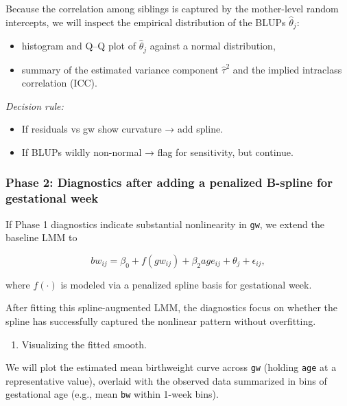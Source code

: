 \documentclass[
  letterpaper,
  DIV=11,
  numbers=noendperiod]{scrreprt}
\providecommand{\tightlist}{%
  \setlength{\itemsep}{0pt}\setlength{\parskip}{0pt}}\usepackage{longtable,booktabs,array}
\begin{document}
Because the correlation among siblings is captured by the mother-level
random intercepts, we will inspect the empirical distribution of the
BLUPs \(\hat\theta_j\):

\begin{itemize}
\tightlist
\item
  histogram and Q--Q plot of \(\hat\theta_j\) against a normal
  distribution,\\
\item
  summary of the estimated variance component \(\hat\tau^2\) and the
  implied intraclass correlation (ICC).
\end{itemize}

\emph{Decision rule:}

\begin{itemize}
\item
  If residuals vs gw show curvature → add spline.
\item
  If BLUPs wildly non-normal → flag for sensitivity, but continue.
\end{itemize}

\hypertarget{phase-2-diagnostics-after-adding-a-penalized-b-spline-for-gestational-week}{%
\subsubsection*{Phase 2: Diagnostics after adding a penalized B-spline
for gestational
week}\label{phase-2-diagnostics-after-adding-a-penalized-b-spline-for-gestational-week}}

If Phase 1 diagnostics indicate substantial nonlinearity in \texttt{gw},
we extend the baseline LMM to

\[
bw_{ij} = \beta_0 + f(gw_{ij}) + \beta_2 age_{ij} + \theta_j + \epsilon_{ij},
\]

where \(f(\cdot)\) is modeled via a penalized spline basis for
gestational week.

After fitting this spline-augmented LMM, the diagnostics focus on
whether the spline has successfully captured the nonlinear pattern
without overfitting.

\begin{enumerate}
\def\labelenumi{\arabic{enumi}.}
\tightlist
\item
  Visualizing the fitted smooth.
\end{enumerate}

We will plot the estimated mean birthweight curve across \texttt{gw}
(holding \texttt{age} at a representative value), overlaid with the
observed data summarized in bins of gestational age (e.g., mean
\texttt{bw} within 1-week bins).
\end{document}
